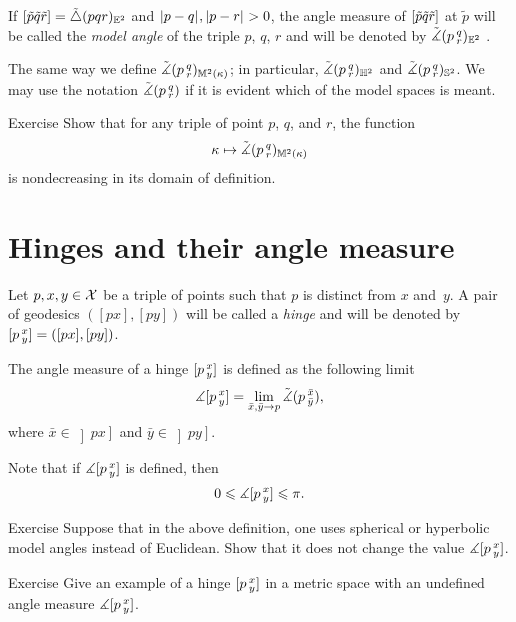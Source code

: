 If 
$[\tilde p\tilde q\tilde r]=\tilde\triangle(p q r)_{\mathbb{E}^2}$ 
and $\dist{p}{q}{},\dist{p}{r}{}>0$, 
the angle measure of 
$[\tilde p\tilde q\tilde r]$ at $\tilde p$ 
will be called the \emph{model angle} of the triple $p$, $q$, $r$ and will be denoted by
$\tilde\measuredangle(p\,{}^{q}_{r})_{\mathbb{E}^2}$%
\index{$\tilde\measuredangle$!$\angk{{*}}{{*}}{{*}}$}.

The same way we define $\tilde\measuredangle(p\,{}^{q}_{r})_{\mathbb{M}^2(\kappa)}$;
in particular, $\tilde\measuredangle(p\,{}^{q}_{r})_{\mathbb{H}^2}$ and $\tilde\measuredangle(p\,{}^{q}_{r})_{\mathbb{S}^2}$.
We may use the notation $\tilde\measuredangle(p\,{}^{q}_{r})$ if it is evident which of the model spaces is meant.

\begin{thm}{Exercise}\label{ex:k-><mono}
Show that for any triple of point $p$, $q$, and $r$,
the function
\[\kappa\mapsto \tilde\measuredangle(p\,{}^{q}_{r})_{\mathbb{M}^2(\kappa)}\]
is nondecreasing in its domain of definition.
\end{thm}


\section{Hinges and their angle measure}\label{sec:angles}

 Let $p,x,y\in \mathcal{X}$ be a triple of points such that $p$ is distinct from $x$ and~$y$.
A pair of geodesics $([p x],[p y])$ will be called  a \emph{hinge} and will be denoted by 
$[p\,{}^{x}_{y}]=([p x],[p y])$\index{$\hinge{{*}}{{*}}{{*}}$}.

The angle measure of a hinge $[p\,{}^{x}_{y}]$ is defined as the following limit
\[\measuredangle[p\,{}^{x}_{y}]=\lim_{\bar x,\bar y\to p} \tilde\measuredangle(p\,{}^{\bar x}_{\bar y}),\]
where $\bar x\in\left]p x\right]$ and $\bar y\in\left]p y\right]$.

Note that if $\measuredangle[p\,{}^{x}_{y}]$ is defined, then
\[0\leqslant \measuredangle[p\,{}^{x}_{y}]\leqslant \pi.\]

\begin{thm}{Exercise}
Suppose that in the above definition, one uses spherical or hyperbolic model angles instead of Euclidean.
Show that it does not change the value $\measuredangle[p\,{}^{x}_{y}]$.
\end{thm}


\begin{thm}{Exercise}\label{ex:undefined-angle}
Give an example of a hinge $[p\,{}^{x}_{y}]$ in a metric space with an undefined angle measure $\measuredangle[p\,{}^{x}_{y}]$.
\end{thm}

